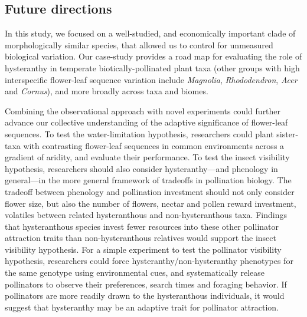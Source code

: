 \documentclass{article}[12pt]
\begin{document}
\subsection*{Future directions}

In this study, we focused on a well-studied, and economically important clade of morphologically similar species, that allowed us to control for unmeasured biological variation. Our case-study provides a road map for evaluating the role of hysteranthy in temperate biotically-pollinated plant taxa (other groups with high interspecific flower-leaf sequence variation include \emph{Magnolia}, \emph{Rhododendron}, \emph{Acer} and \emph{Cornus}), and more broadly across taxa and biomes.

Combining the observational approach with novel experiments could further advance our collective understanding of the adaptive significance of flower-leaf sequences. To test the water-limitation hypothesis, researchers could plant sister-taxa with contrasting flower-leaf sequences in common environments across a gradient of aridity, and evaluate their performance. To test the insect visibility hypothesis, researchers should also consider hysteranthy---and phenology in general---in the more general framework of tradeoffs in pollination biology. The tradeoff between phenology and pollination investment should not only consider flower size, but also the number of flowers, nectar and pollen reward investment, volatiles between related hysteranthous and non-hysteranthous taxa. Findings that hysteranthous species invest fewer resources into these other pollinator attraction traits than non-hysteranthous relatives would support the insect visibility hypothesis. For a simple experiment to test the pollinator visibility hypothesis, researchers could force hysteranthy/non-hysteranthy phenotypes for the same genotype using environmental cues, and systematically release pollinators to observe their preferences, search times and foraging behavior. If pollinators are more readily drawn to the hysteranthous individuals, it would suggest that hysteranthy may be an adaptive trait for pollinator attraction. %
\end{document}
